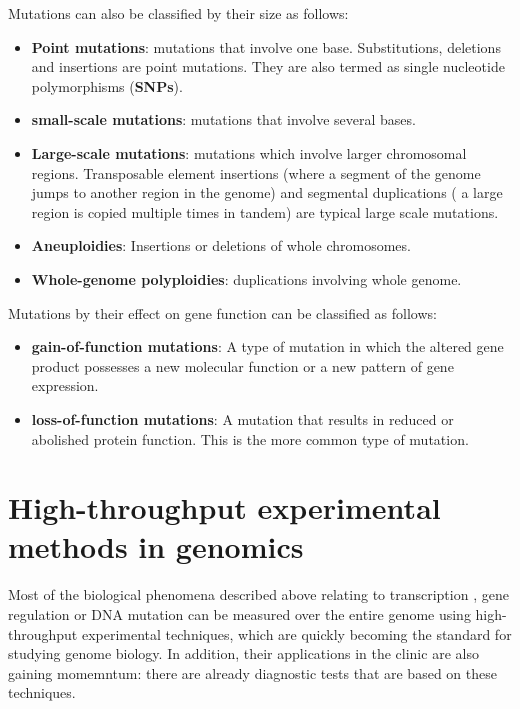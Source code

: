 \documentclass[12pt,]{krantz}
\providecommand{\tightlist}{%
  \setlength{\itemsep}{0pt}\setlength{\parskip}{0pt}}
\theoremstyle{definition}
\theoremstyle{definition}
\theoremstyle{definition}
\theoremstyle{remark}
\begin{document}
Mutations can also be classified by their size as follows:

\begin{itemize}
\tightlist
\item
  \textbf{Point mutations}: mutations that involve one base.
  Substitutions, deletions and insertions are point mutations. They are
  also termed as single nucleotide polymorphisms (\textbf{SNPs}).
\item
  \textbf{small-scale mutations}: mutations that involve several bases.
\item
  \textbf{Large-scale mutations}: mutations which involve larger
  chromosomal regions. Transposable element insertions (where a segment
  of the genome jumps to another region in the genome) and segmental
  duplications ( a large region is copied multiple times in tandem) are
  typical large scale mutations.
\item
  \textbf{Aneuploidies}: Insertions or deletions of whole chromosomes.
\item
  \textbf{Whole-genome polyploidies}: duplications involving whole
  genome.
\end{itemize}

Mutations by their effect on gene function can be classified as follows:

\begin{itemize}
\tightlist
\item
  \textbf{gain-of-function mutations}: A type of mutation in which the
  altered gene product possesses a new molecular function or a new
  pattern of gene expression.
\item
  \textbf{loss-of-function mutations}: A mutation that results in
  reduced or abolished protein function. This is the more common type of
  mutation.
\end{itemize}

\hypertarget{high-throughput-experimental-methods-in-genomics}{%
\section{High-throughput experimental methods in
genomics}\label{high-throughput-experimental-methods-in-genomics}}

Most of the biological phenomena described above relating to
transcription , gene regulation or DNA mutation can be measured over the
entire genome using high-throughput experimental techniques, which are
quickly becoming the standard for studying genome biology. In addition,
their applications in the clinic are also gaining momemntum: there are
already diagnostic tests that are based on these techniques.
\end{document}
